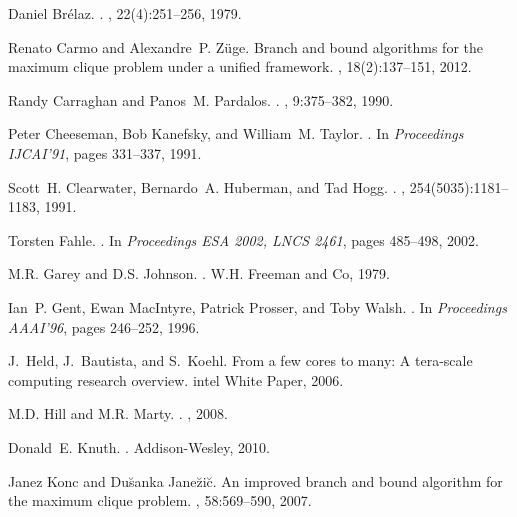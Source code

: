 \documentclass{l4proj}
\begin{document}
\begin{thebibliography}{10}

Daniel Br\'{e}laz.
.
, 22(4):251--256, 1979.

Renato Carmo and Alexandre~P. Z{\"u}ge.
\newblock Branch and bound algorithms for the maximum clique problem under a
  unified framework.
, 18(2):137--151, 2012.

Randy Carraghan and Panos~M. Pardalos.
.
, 9:375--382, 1990.

Peter Cheeseman, Bob Kanefsky, and William~M. Taylor.
.
\newblock In {\em Proceedings {IJCAI'91}}, pages 331--337, 1991.

Scott~H. Clearwater, Bernardo~A. Huberman, and Tad Hogg.
.
, 254(5035):1181--1183, 1991.

Torsten Fahle.
.
\newblock In {\em Proceedings {ESA 2002}, LNCS 2461}, pages 485--498, 2002.

M.R. Garey and D.S. Johnson.
.
\newblock W.H. Freeman and Co, 1979.

Ian~P. Gent, Ewan MacIntyre, Patrick Prosser, and Toby Walsh.
.
\newblock In {\em Proceedings {AAAI'96}}, pages 246--252, 1996.

J.~Held, J.~Bautista, and S.~Koehl.
\newblock From a few cores to many: A tera-scale computing research overview.
\newblock intel White Paper, 2006.

M.D. Hill and M.R. Marty.
.
, 2008.

Donald~E. Knuth.
.
\newblock Addison-Wesley, 2010.

Janez Konc and Du\u{s}anka Jane\u{z}i\u{c}.
\newblock An improved branch and bound algorithm for the maximum clique
  problem.
,
  58:569--590, 2007.


\end{thebibliography}
\end{document}

